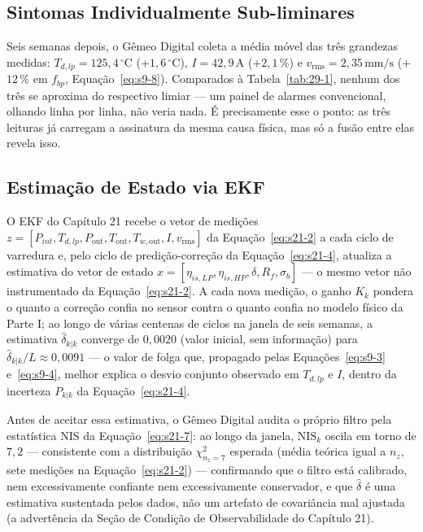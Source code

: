 \documentclass[12pt,a4paper]{article}
\numberwithin{equation}{section}
\numberwithin{table}{section}
\numberwithin{figure}{section}
\begin{document}
\subsection{Sintomas Individualmente Sub-liminares}

Seis semanas depois, o Gêmeo Digital coleta a média móvel das três grandezas medidas: $T_{d,lp} = 125{,}4\,^{\circ}\text{C}$ (+$1{,}6\,^{\circ}\text{C}$), $I = 42{,}9\,\text{A}$ (+$2{,}1\,\%$) e $v_{\text{rms}} = 2{,}35\,\text{mm/s}$ (+$12\,\%$ em $f_{bp}$, Equação~\eqref{eq:s9-8}). Comparados à Tabela~\ref{tab:29-1}, nenhum dos três se aproxima do respectivo limiar — um painel de alarmes convencional, olhando linha por linha, não veria nada. É precisamente esse o ponto: as três leituras já carregam a assinatura da mesma causa física, mas só a fusão entre elas revela isso.

\subsection{Estimação de Estado via EKF}

O EKF do Capítulo 21 recebe o vetor de medições $z = [P_{int}, T_{d,lp}, P_{\text{out}}, T_{\text{out}}, T_{w,\text{out}}, I, v_{\text{rms}}]$ da Equação~\eqref{eq:s21-2} a cada ciclo de varredura e, pelo ciclo de predição-correção da Equação~\eqref{eq:s21-4}, atualiza a estimativa do vetor de estado $x = [\eta_{is,LP}, \eta_{is,HP}, \delta, R_f, \sigma_b]$ — o mesmo vetor não instrumentado da Equação~\eqref{eq:s21-2}. A cada nova medição, o ganho $K_k$ pondera o quanto a correção confia no sensor contra o quanto confia no modelo físico da Parte I; ao longo de várias centenas de ciclos na janela de seis semanas, a estimativa $\hat\delta_{k|k}$ converge de $0{,}0020$ (valor inicial, sem informação) para $\hat\delta_{k|k}/L \approx 0{,}0091$ — o valor de folga que, propagado pelas Equações~\eqref{eq:s9-3} e~\eqref{eq:s9-4}, melhor explica o desvio conjunto observado em $T_{d,lp}$ e $I$, dentro da incerteza $P_{k|k}$ da Equação~\eqref{eq:s21-4}.

Antes de aceitar essa estimativa, o Gêmeo Digital audita o próprio filtro pela estatística NIS da Equação~\eqref{eq:s21-7}: ao longo da janela, $\text{NIS}_k$ oscila em torno de $7{,}2$ — consistente com a distribuição $\chi^2_{n_z=7}$ esperada (média teórica igual a $n_z$, sete medições na Equação~\eqref{eq:s21-2}) — confirmando que o filtro está calibrado, nem excessivamente confiante nem excessivamente conservador, e que $\hat\delta$ é uma estimativa sustentada pelos dados, não um artefato de covariância mal ajustada (a advertência da Seção de Condição de Observabilidade do Capítulo 21).
\end{document}
